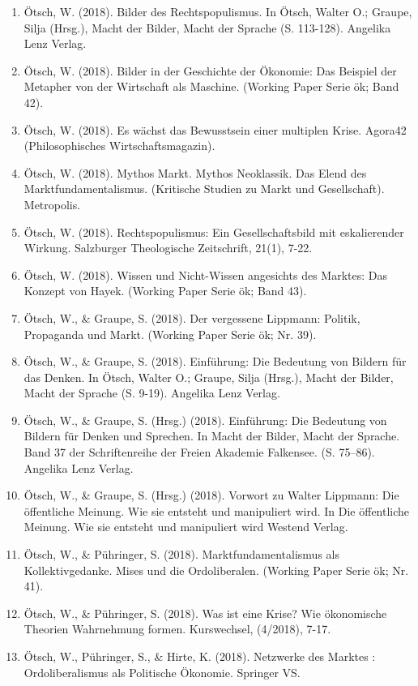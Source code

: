 \begin{enumerate}
	 \item Ötsch, W. (2018). Bilder des Rechtspopulismus. In Ötsch, Walter O.; Graupe, Silja (Hrsg.), Macht der Bilder, Macht der Sprache (S. 113-128). Angelika Lenz Verlag.
	 \item Ötsch, W. (2018). Bilder in der Geschichte der Ökonomie: Das Beispiel der Metapher von der Wirtschaft als Maschine. (Working Paper Serie ök; Band 42).
	 \item Ötsch, W. (2018). Es wächst das Bewusstsein einer multiplen Krise. Agora42 (Philosophisches Wirtschaftsmagazin).
	 \item Ötsch, W. (2018). Mythos Markt. Mythos Neoklassik. Das Elend des Marktfundamentalismus. (Kritische Studien zu Markt und Gesellschaft). Metropolis.
	 \item Ötsch, W. (2018). Rechtspopulismus: Ein Gesellschaftsbild mit eskalierender Wirkung. Salzburger Theologische Zeitschrift, 21(1), 7-22.
	 \item Ötsch, W. (2018). Wissen und Nicht-Wissen angesichts \glqq des Marktes\grqq{}: Das Konzept von Hayek. (Working Paper Serie ök; Band 43).
	 \item Ötsch, W., \& Graupe, S. (2018). Der vergessene Lippmann: Politik, Propaganda und Markt. (Working Paper Serie ök; Nr. 39).
	 \item Ötsch, W., \& Graupe, S. (2018). Einführung: Die Bedeutung von Bildern für das Denken. In Ötsch, Walter O.; Graupe, Silja (Hrsg.), Macht der Bilder, Macht der Sprache (S. 9-19). Angelika Lenz Verlag.
	 \item Ötsch, W., \& Graupe, S. (Hrsg.) (2018). Einführung: Die Bedeutung von Bildern für Denken und Sprechen. In Macht der Bilder, Macht der Sprache. Band 37 der Schriftenreihe der Freien Akademie Falkensee. (S. 75–86). Angelika Lenz Verlag.
	 \item Ötsch, W., \& Graupe, S. (Hrsg.) (2018). Vorwort zu Walter Lippmann: Die öffentliche Meinung. Wie sie entsteht und manipuliert wird. In Die öffentliche Meinung. Wie sie entsteht und manipuliert wird Westend Verlag.
	 \item Ötsch, W., \& Pühringer, S. (2018). Marktfundamentalismus als Kollektivgedanke. Mises und die Ordoliberalen. (Working Paper Serie ök; Nr. 41).
	 \item Ötsch, W., \& Pühringer, S. (2018). Was ist eine Krise? Wie ökonomische Theorien Wahrnehmung formen. Kurswechsel, (4/2018), 7-17.
	 \item Ötsch, W., Pühringer, S., \& Hirte, K. (2018). Netzwerke des Marktes : Ordoliberalismus als Politische Ökonomie. Springer VS.
\end{enumerate}
